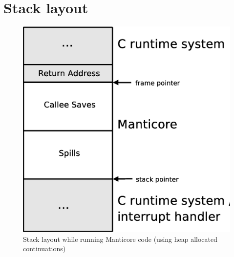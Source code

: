 \documentclass[11pt]{article}
\begin{document}
\section{Stack layout}
\begin{figure}[tp]
  \begin{center}
    \includegraphics[scale=0.5]{pictures/stack-heap-alloc}
  \end{center}%
  \caption{Stack layout while running Manticore code (using heap allocated
    continuations)}
  \label{fig:stack-heap-alloc}
\end{figure}%
\end{document}
